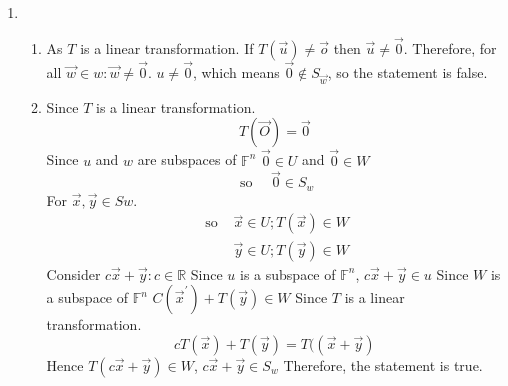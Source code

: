 \documentclass[11pt]{article}
\begin{document}
\begin{enumerate}[{\bf Q1.}]
		\item
		\begin{enumerate}
			\item 
			As $T$ is a linear transformation. If $T(\vec{u}) \neq \vec{o}$ then $\vec{u} \neq \overrightarrow{0}$. Therefore, for all $\vec{w} \in w: \vec{w} \neq \overrightarrow{0}$. $u \neq \overrightarrow{0}$, which means $\overrightarrow{0} \notin S_{\vec{w}}$, so the statement is false.
			\item 
			Since $T$ is a linear transformation.
			$$
			T(\vec{O})=\overrightarrow{0}
			$$
			Since $u$ and $w$ are subspaces of $\mathbb{F}^n$ $\overrightarrow{0} \in U$ and $\overrightarrow{0} \in W$
			$$
			\text { so } \quad \overrightarrow{0} \in S_w
			$$
			For $\vec{x}, \vec{y} \in S w$.
			$$
			\begin{aligned}
			\text { so } & \vec{x} \in U ; T(\vec{x}) \in W \\
			& \vec{y} \in U ; T(\vec{y}) \in W
			\end{aligned}
			$$
			Consider $c \vec{x}+\vec{y}: c \in \mathbb{R}$ \newline
			Since $u$ is a subspace of $\mathbb{F}^n$, $c \vec{x}+\vec{y} \in u$ \newline
			Since $W$ is a subspace of $\mathbb{F}^n$ \newline
			$C\left(\vec{x}^{\prime}\right)+T(\vec{y}) \in W$ \newline
			Since $T$ is a linear transformation.
			$$
			c T(\vec{x})+T(\vec{y})=T((\vec{x}+\vec{y})
			$$
			Hence $T(c \vec{x}+\vec{y}) \in W$, $c \vec{x}+\vec{y} \in S_w$ \newline
			Therefore, the statement is true.
		\end{enumerate}
		
		\newpage
		

\end{enumerate}
\end{document}
